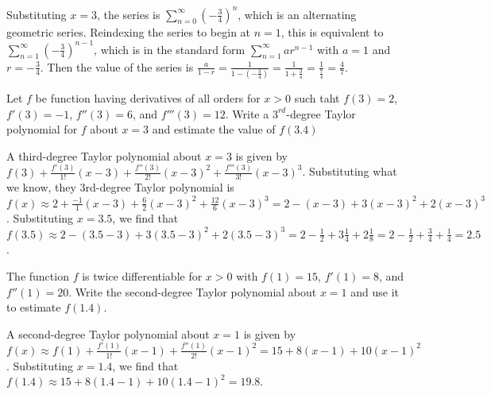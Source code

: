 \begin{Answer}[ref = mac1]
Substituting $x = 3$, the series is $\sum_{n=0}^\infty \left( -\frac{3}{4} 
\right)^n$, which is an alternating geometric series. Reindexing the series to 
begin at $n = 1$, this is equivalent to $\sum_{n = 1}^\infty \left( - 
\frac{3}{4} \right) ^ {n - 1}$, which is in the standard form $\sum_{n=1}^
\infty ar^{n-1}$ with $a = 1$ and $r = -\frac{3}{4}$. Then the value of the 
series is $\frac{a}{1-r} = \frac{1}{1-\left(- \frac{3}{4} \right)} = \frac{1}{1 
+ \frac{3}{4}} = \frac{1}{\frac{7}{4}} = \frac{4}{7}$. 
\end{Answer}

\begin{Exercise} Let $f$ be function having 
derivatives of all orders for $x > 0$ such taht $f(3) = 2$, $f'(3) = -1$, 
$f''(3) = 6$, and $f'''(3) = 12$. Write a $3^{rd}$-degree Taylor polynomial 
for $f$ about $x = 3$ and estimate the value of $f(3.4)$
\end{Exercise}

\begin{Answer}[ref = taylor1]
A third-degree Taylor polynomial about $x = 3$ is given by $f(3) + \frac{
f'(3)}{1!} (x - 3) + \frac{f''(3)}{2!} (x - 3) ^ 2 + \frac{f'''(3)}{3!} (x - 3) 
^ 3$. Substituting what we know, they 3rd-degree Taylor polynomial is $f(x) 
\approx 2 + \frac{-1}{1} (x - 3) + \frac{6}{2} (x - 3) ^ 2 + \frac{12}{6}(x - 
3) ^ 3 = 2 - (x - 3) + 3 (x - 3) ^ 2 + 2 (x - 3) ^ 3$. Substituting $x = 3.5$, 
we find that $f(3.5) \approx 2 - (3.5 - 3) + 3 ( 3.5 - 3) ^ 2 + 2 (3.5 - 3) ^ 3 
= 2 - \frac{1}{2} + 3 \frac{1}{4} + 2\frac{1}{8} = 2 - \frac{1}{2} + 
\frac{3}{4} + \frac{1}{4} = 2.5$.
\end{Answer}

\begin{Exercise} The function $f$ is twice 
differentiable for $x > 0$ with $f(1) = 15$, $f'(1) = 8$, and $f''(1) = 20$. 
Write the second-degree Taylor polynomial about $x = 1$ and use it to 
estimate $f(1.4)$.
\end{Exercise}

\begin{Answer}
A second-degree Taylor polynomial about $x = 1$ is given by $f(x) \approx f(1) 
+ \frac{f'(1)}{1!}(x - 1) + \frac{f''(1)}{2!}(x - 1)^2 = 15 + 8(x - 1) + 10(x 
- 1)^2$. Substituting $x = 1.4$, we find that $f(1.4) \approx 15 + 8(1.4 - 1) 
+ 10(1.4 - 1)^2 = 19.8$.
\end{Answer}


